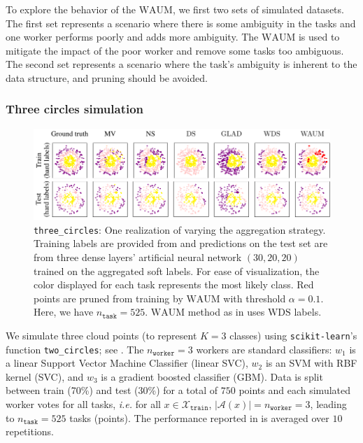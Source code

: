 To explore the behavior of the $\mathrm{WAUM}$, we first two sets of simulated datasets.
The first set represents a scenario where there is some ambiguity in the tasks and one worker performs poorly and adds more ambiguity. The $\mathrm{WAUM}$ is used to mitigate the impact of the poor worker and remove some tasks too ambiguous.
The second set represents a scenario where the task's ambiguity is inherent to the data structure, and pruning should be avoided.

\subsubsection*{Three circles simulation}

\begin{figure}[thb]
    \centering
    \includegraphics[width=.8\textwidth]{images/Preds3circles}
    \caption{\texttt{three\_circles}: One realization of  varying the aggregation strategy. Training labels are provided from  and predictions on the test set are from three dense layers' artificial neural network $(30, 20, 20)$ trained on the aggregated soft labels. For ease of visualization, the color displayed for each task represents the most likely class.
        Red points are pruned from training by $\mathrm{WAUM}$ with threshold $\alpha=0.1$. Here, we have $n_{\texttt{task}}=525$.
        $\mathrm{WAUM}$ method as in  uses $\mathrm{WDS}$ labels.
        }
    \label{fig:threecircles_predictions}
\end{figure}

We simulate three cloud points (to represent $K=3$ classes) using \texttt{scikit-learn}'s function \texttt{two\_circles}; see .
The $n_\texttt{worker}=3$ workers are standard classifiers: $w_1$ is a linear Support Vector Machine Classifier (linear SVC), $w_2$ is an SVM with RBF kernel (SVC), and $w_3$ is a gradient boosted classifier (GBM).
Data is split between train (70\%) and test (30\%) for a total of $750$ points and each simulated worker votes for all tasks, \emph{i.e.} for all $x\in\mathcal{X}_\texttt{train}$, $|\mathcal{A}(x)|=n_\texttt{worker}=3$, leading to $n_{\texttt{task}}=525$ tasks (points).
The performance reported in  is averaged over $10$ repetitions.

